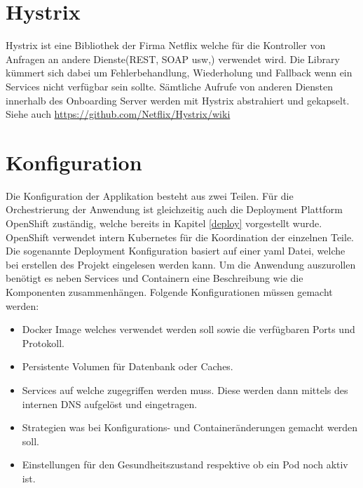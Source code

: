 \section{Hystrix}
\label{hystrix}

Hystrix ist eine Bibliothek der Firma Netflix welche für die Kontroller von Anfragen an andere Dienste(REST, SOAP usw,) verwendet wird. Die Library kümmert sich dabei um Fehlerbehandlung, Wiederholung und Fallback wenn ein Services nicht verfügbar sein sollte. Sämtliche Aufrufe von anderen Diensten innerhalb des Onboarding Server werden mit Hystrix abstrahiert und gekapselt. Siehe auch \url{https://github.com/Netflix/Hystrix/wiki}

\section{Konfiguration}
\label{config}

Die Konfiguration der Applikation besteht aus zwei Teilen. Für die Orchestrierung der Anwendung ist gleichzeitig auch die Deployment Plattform OpenShift zuständig, welche bereits in Kapitel \ref{deploy} vorgestellt wurde. OpenShift verwendet intern Kubernetes für die Koordination der einzelnen Teile. Die sogenannte Deployment Konfiguration basiert auf einer yaml Datei, welche bei erstellen des Projekt eingelesen werden kann. 
Um die Anwendung  auszurollen benötigt es neben Services und Containern eine Beschreibung wie die Komponenten zusammenhängen. Folgende Konfigurationen müssen gemacht werden:\newline
\begin{itemize}
	\item Docker Image welches verwendet werden soll sowie die verfügbaren Ports und Protokoll.
	\item Persistente Volumen für Datenbank oder Caches.
	\item Services auf welche zugegriffen werden muss. Diese werden dann mittels des internen DNS aufgelöst und eingetragen.
	\item Strategien was bei Konfigurations- und Containeränderungen gemacht werden soll.
	\item Einstellungen für den Gesundheitszustand respektive ob ein Pod noch aktiv ist.
\end{itemize}

